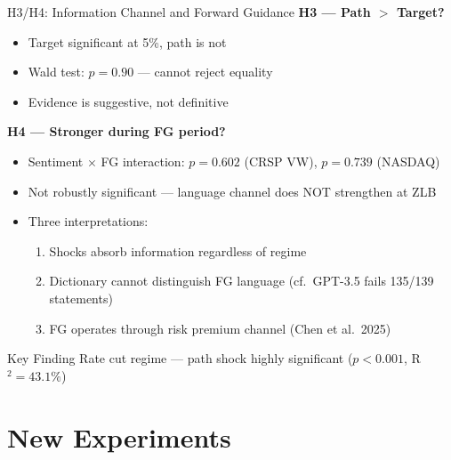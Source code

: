 \documentclass[aspectratio=169, 11pt]{beamer}
\begin{document}
\begin{frame}{H3/H4: Information Channel and Forward Guidance}
  \textbf{H3 --- Path $>$ Target?}
  \begin{itemize}
    \item Target significant at 5\%, path is not
    \item Wald test: $p = 0.90$ --- cannot reject equality
    \item Evidence is suggestive, not definitive
  \end{itemize}

  \vspace{0.5em}
  \textbf{H4 --- Stronger during FG period?}
  \begin{itemize}
    \item Sentiment $\times$ FG interaction: $p = 0.602$ (CRSP VW), $p = 0.739$ (NASDAQ)
    \item Not robustly significant --- language channel does NOT strengthen at ZLB
    \item Three interpretations:
      \begin{enumerate}
        \item Shocks absorb information regardless of regime
        \item Dictionary cannot distinguish FG language (cf.\ GPT-3.5 fails 135/139 statements)
        \item FG operates through risk premium channel (Chen et al.\ 2025)
      \end{enumerate}
  \end{itemize}

  \vspace{0.3em}
  \begin{block}{Key Finding}
    Rate cut regime --- path shock highly significant ($p < 0.001$, R$^2 = 43.1\%$)
  \end{block}
\end{frame}

\section{New Experiments}
\end{document}

